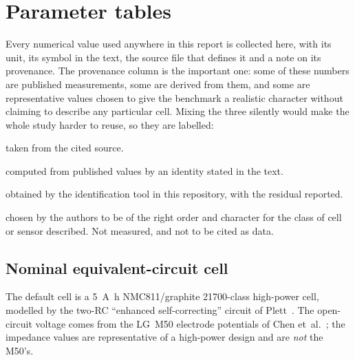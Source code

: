 \chapter{Parameter tables}
\label{app:params}

Every numerical value used anywhere in this report is collected here, with its unit, its symbol in
the text, the source file that defines it and a note on its provenance. The provenance column is
the important one: some of these numbers are published measurements, some are derived from them,
and some are representative values chosen to give the benchmark a realistic character without
claiming to describe any particular cell. Mixing the three silently would make the whole study
harder to reuse, so they are labelled:

\begin{description}[leftmargin=2.2cm,style=nextline,topsep=2pt,itemsep=1pt]
\item[\textsf{published}] taken from the cited source.
\item[\textsf{derived}] computed from published values by an identity stated in the text.
\item[\textsf{fitted}] obtained by the identification tool in this repository, with the residual
reported.
\item[\textsf{representative}] chosen by the authors to be of the right order and character for the
class of cell or sensor described. Not measured, and not to be cited as data.
\end{description}

\section{Nominal equivalent-circuit cell}

The default cell is a \SI{5}{\ampere\hour} NMC811/graphite 21700-class high-power cell, modelled by
the two-RC ``enhanced self-correcting'' circuit of Plett~\cite{plett2004ekf1,plett2015bms1}. The
open-circuit voltage comes from the LG~M50 electrode potentials of Chen
et~al.~\cite{chen2020parameterization}; the impedance values are representative of a high-power
design and are \emph{not} the M50's.

